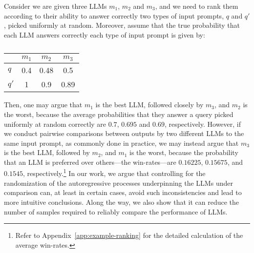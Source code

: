 %
Consider we are given three LLMs $m_1$, $m_2$ and $m_3$, and we need to rank them according to their ability to answer correctly two types of input prompts, $q$ and $q'$, picked uniformly at random.
%
Moreover, assume that the true probability that each LLM answers correctly each type of input prompt is given by:
%
\begin{table}[h]
    \centering
    \begin{tabular}{lccc}
        \toprule
         & $m_1$ & $m_2$ & $m_3$ \\
        \midrule
        $q$           & 0.4             & 0.48           & 0.5             \\
        $q'$           & 1           & 0.9         & 0.89              \\
        \bottomrule
 \end{tabular}
 \vspace{-8mm}
 \caption*{}
 \end{table}

Then, one may argue that $m_1$ is the best LLM, followed closely by $m_3$, and $m_2$ is the worst, because the average probabilities that they answer a query picked uniformly at random correctly are $0.7$, $0.695$ and $0.69$, respectively.
%
However, if we conduct pairwise comparisons between outputs by two different LLMs to the same input prompt, as commonly done in practice, we may instead argue that $m_3$ is the best LLM, followed by $m_2$, and $m_1$ is the worst, because the probability that an LLM is preferred over others---the win-rates---are $0.16225$, $0.15675$, and $0.1545$, respectively.\footnote{Refer to Appendix~\ref{app:example-ranking} for the detailed calculation of the average win-rates.}
%
In our work, we argue that controlling for the randomization of the autoregressive processes underpinning the LLMs under comparison can, at least in certain cases, avoid such inconsistencies and lead to more intuitive conclusions.
%
Along the way, we also show that it can reduce the number of samples required to reliably compare the performance of LLMs. 


